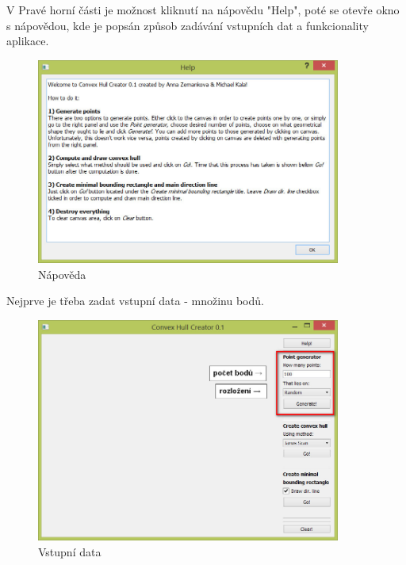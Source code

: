 \documentclass[a4paper, 12pt]{article}
\begin{document}
V Pravé horní části je možnost kliknutí na nápovědu "Help", poté se otevře okno s nápovědou, 
kde je popsán způsob zadávání vstupních dat a funkcionality aplikace.\\

\begin{figure}[h!]
	\centering
	\includegraphics[width=10cm]{help.jpg}
	\caption{Nápověda}
\end{figure}

\clearpage


Nejprve je třeba zadat vstupní data - množinu bodů.\\
\begin{figure}[h!]
	\centering
	\includegraphics[width=10cm]{vstup_nastaveni.jpg}
	\caption{Vstupní data}
\end{figure}
\end{document}
